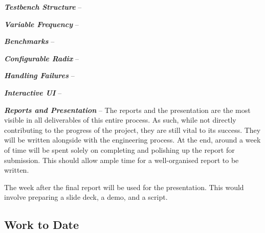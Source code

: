 \textit{\textbf{Testbench Structure}} --

\textit{\textbf{Variable Frequency}} --

\textit{\textbf{Benchmarks}} --

\textit{\textbf{Configurable Radix}} --

\textit{\textbf{Handling Failures}} --

\textit{\textbf{Interactive UI}} --

\textit{\textbf{Reports and Presentation}} --
The reports and the presentation are the most visible in all deliverables of
this entire process.
As such, while not directly contributing to the progress of the project,
they are still vital to its success.
They will be written alongside with the engineering process.
At the end, around a week of time will be spent solely on completing and
polishing up the report for submission.
This should allow ample time for a well-organised report to be written.

The week after the final report will be used for the presentation.
This would involve preparing a slide deck, a demo, and a script.

\subsection{Work to Date}

